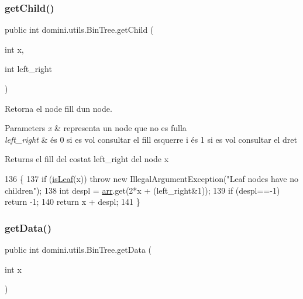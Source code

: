 \subsubsection{\texorpdfstring{get\+Child()}{getChild()}}
{\footnotesize\ttfamily public int domini.\+utils.\+Bin\+Tree.\+get\+Child (\begin{DoxyParamCaption}\item[{int}]{x,  }\item[{int}]{left\+\_\+right }\end{DoxyParamCaption})\hspace{0.3cm}{\ttfamily [inline]}}



Retorna el node fill d\textquotesingle{}un node. 


\begin{DoxyParams}{Parameters}
{\em x} & representa un node que no es fulla \\
\hline
{\em left\+\_\+right} & és 0 si es vol consultar el fill esquerre i és 1 si es vol consultar el dret \\
\hline
\end{DoxyParams}
\begin{DoxyReturn}{Returns}
el fill del costat left\+\_\+right del node x 
\end{DoxyReturn}

\begin{DoxyCode}
136                                                \{
137         \textcolor{keywordflow}{if} (\hyperlink{classdomini_1_1utils_1_1BinTree_a37030e961f5613a5c74984ac002d965b}{isLeaf}(x)) \textcolor{keywordflow}{throw} \textcolor{keyword}{new} IllegalArgumentException(\textcolor{stringliteral}{"Leaf nodes have no children"});
138         \textcolor{keywordtype}{int} despl = \hyperlink{classdomini_1_1utils_1_1BinTree_a357bcbcf07ba7fcb99d11b237d189e65}{arr}.get(2*x + (left\_right&1));
139         \textcolor{keywordflow}{if} (despl==-1) \textcolor{keywordflow}{return} -1;
140         \textcolor{keywordflow}{return} x + despl;
141     \}
\end{DoxyCode}
\mbox{\label{classdomini_1_1utils_1_1BinTree_ad8734786aa8ba40815e4b782264aef64}} 
\subsubsection{\texorpdfstring{get\+Data()}{getData()}}
{\footnotesize\ttfamily public int domini.\+utils.\+Bin\+Tree.\+get\+Data (\begin{DoxyParamCaption}\item[{int}]{x }\end{DoxyParamCaption})\hspace{0.3cm}{\ttfamily [inline]}}




